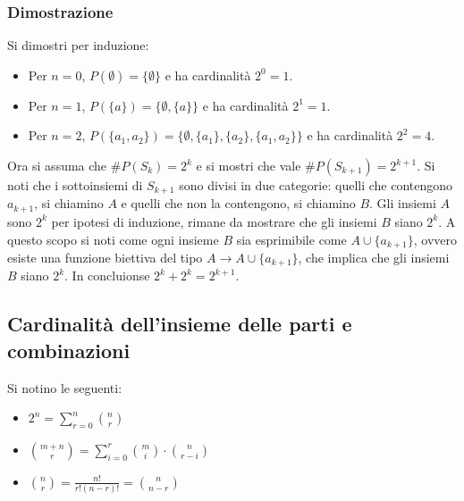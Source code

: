 \subsubsection{Dimostrazione}
Si dimostri per induzione:
\begin{itemize}
\item Per $n=0$, $P(\emptyset)=\{\emptyset\}$ e ha cardinalit\`a $2^0=1$.
\item Per $n=1$, $P(\{a\})=\{\emptyset,\{a\}\}$ e ha cardinalit\`a $2^1=1$.
\item Per $n=2$, $P(\{a_1,a_2\})=\{\emptyset, \{a_1\},\{a_2\},\{a_1,a_2\}\}$ e ha cardinalit\`a $2^2=4$.
\end{itemize}
Ora si assuma che $\#P(S_k)=2^k$ e si mostri che vale $\#P(S_{k+1})=2^{k+1}$. Si noti che i sottoinsiemi di $S_{k+1}$ sono divisi in due categorie: quelli che 
contengono $a_{k+1}$, si chiamino $A$ e quelli che non la contengono, si chiamino $B$. Gli insiemi $A$ sono $2^k$ per ipotesi di induzione, rimane da mostrare 
che gli insiemi $B$ siano $2^k$. A questo scopo si noti come ogni insieme $B$ sia esprimibile come $A\cup \{a_{k+1}\}$, ovvero esiste una funzione biettiva del 
tipo $A\rightarrow A\cup\{a_{k+1}\}$, che implica che gli insiemi $B$ siano $2^k$. In concluionse $2^k+2^k=2^{k+1}$.
\subsection{Cardinalit\`a dell'insieme delle parti e combinazioni}
Si notino le seguenti:
\begin{itemize}
\item $2^n=\sum\limits_{r=0}^n\binom{n}{r}$
\item $\binom{m+n}{r}=\sum\limits_{i=0}^r\binom{m}{i}\cdot\binom{n}{r-i}$
\item $\binom{n}{r}=\frac{n!}{r!(n-r)!}=\binom{n}{n-r}$
\end{itemize} 